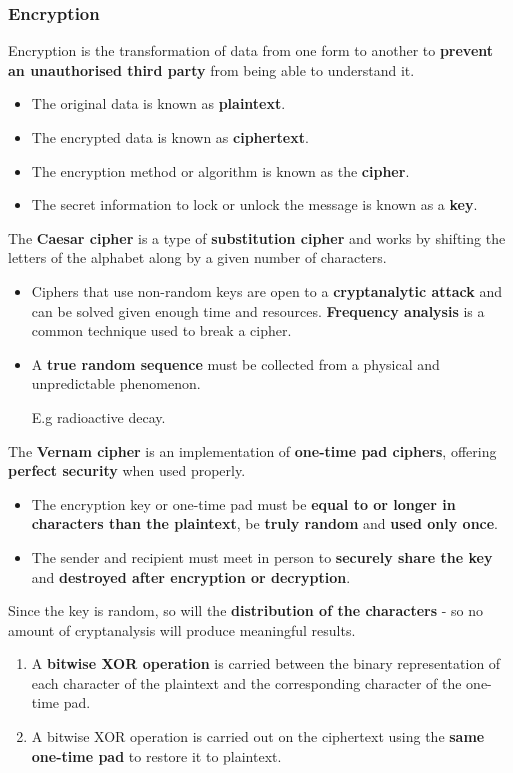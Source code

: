 \subsubsection*{Encryption}

Encryption is the transformation of data from one form to another to \textbf{prevent an unauthorised third party} from being able to understand it.
\begin{itemize}
    \item The original data is known as \textbf{plaintext}.
    \item The encrypted data is known as \textbf{ciphertext}.
    \item The encryption method or algorithm is known as the \textbf{cipher}.
    \item The secret information to lock or unlock the message is known as a \textbf{key}.
\end{itemize}

The \textbf{Caesar cipher} is a type of \textbf{substitution cipher} and works by shifting the letters of the alphabet along by a given number of characters.

\begin{itemize}
    \item Ciphers that use non-random keys are open to a \textbf{cryptanalytic attack} and can be solved given enough time and resources. \textbf{Frequency analysis} is a common technique used to break a cipher.
    \item A \textbf{true random sequence} must be collected from a physical and unpredictable phenomenon.

        E.g radioactive decay.
\end{itemize}

The \textbf{Vernam cipher} is an implementation of \textbf{one-time pad ciphers}, offering \textbf{perfect security} when used properly.
\begin{itemize}
    \item The encryption key or one-time pad must be \textbf{equal to or longer in characters than the plaintext}, be \textbf{truly random} and \textbf{used only once}.
    \item The sender and recipient must meet in person to \textbf{securely share the key} and \textbf{destroyed after encryption or decryption}.
\end{itemize}

Since the key is random, so will the \textbf{distribution of the characters} - so no amount of cryptanalysis will produce meaningful results.
\begin{enumerate}
    \item A \textbf{bitwise XOR operation} is carried between the binary representation of each character of the plaintext and the corresponding character of the one-time pad.
    \item A bitwise XOR operation is carried out on the ciphertext using the \textbf{same one-time pad} to restore it to plaintext.
\end{enumerate}

